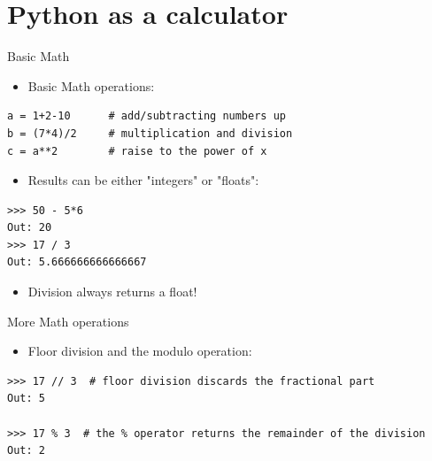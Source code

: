 \documentclass[compress%
,aspectratio=169%
]{beamer}
\begin{document}
\section{Python as a calculator}

\begin{frame}[fragile]{Basic Math}
    \begin{itemize}
        \item Basic Math operations:
    \end{itemize}

\begin{lstlisting}
a = 1+2-10      # add/subtracting numbers up
b = (7*4)/2     # multiplication and division
c = a**2        # raise to the power of x
\end{lstlisting}

    \begin{itemize}
        \item Results can be either "integers" or "floats":
    \end{itemize}

\begin{lstlisting}
>>> 50 - 5*6
Out: 20
>>> 17 / 3
Out: 5.666666666666667
\end{lstlisting}

\begin{itemize}
    \item Division always returns a float!
\end{itemize}
\end{frame}


\begin{frame}[fragile]{More Math operations}

\begin{itemize}
    \item Floor division and the modulo operation:
\end{itemize}
    \begin{lstlisting}
>>> 17 // 3  # floor division discards the fractional part
Out: 5

>>> 17 % 3  # the % operator returns the remainder of the division
Out: 2
    \end{lstlisting}
\end{frame}
\end{document}
